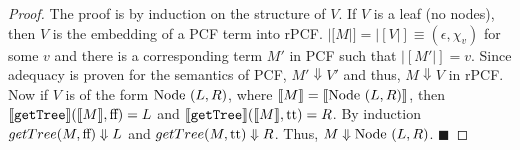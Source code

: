 \begin{proof}
The proof is by induction on the structure of $V$.  If $V$ is a leaf (no nodes), then $V$ is the embedding of a PCF term into rPCF.  $|[M|] = |[V|] \equiv (\epsilon, \chi_v)$ for some $v$ and there is a corresponding term $M'$ in PCF such that $|[M'|] = v$.  Since adequacy is proven for the semantics of PCF, $M' \Downarrow V'$ and thus, $M \Downarrow V$ in rPCF.  Now if $V$ is of the form $\textrm{Node }(L,R)$, where $|[M|] = |[\textrm{Node }(L,R)|]$, then $|[\texttt{getTree}|](|[M|], \textrm{ff }\!\!) = L$ and $|[\texttt{getTree}|](|[M|], \textrm{tt }\!\!) = R$.  By induction $getTree(M, \textrm{ff }\!\!) \Downarrow L$ and $getTree(M, \textrm{tt }\!\!) \Downarrow R$.  Thus, $M \Downarrow \textrm{Node }(L,R)$.
\hfill $\blacksquare$
\end{proof}

